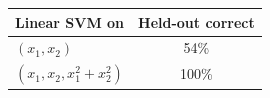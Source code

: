 \begin{tabular}{lc}
\toprule
\textbf{Linear SVM on} & \textbf{Held-out correct} \\
\midrule
$(x_1, x_2)$ & 54\% \\
$(x_1, x_2, x_1^2 + x_2^2)$ & 100\% \\
\bottomrule
\end{tabular}

